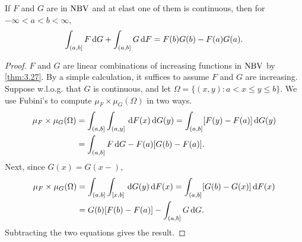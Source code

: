 \documentclass[12pt]{article} %
\begin{document}
\begin{theorem}
    If $F$ and $G$ are in $\operatorname{NBV}$ and at elast one of them is continuous, then for $-\infty < a < b < \infty$, \[\int_{(a, b]}F \, \mathrm{d} G + \int_{(a, b]}G \, \mathrm{d} F = F(b)G(b) - F(a)G(a).\]
\end{theorem}

\begin{proof}
    $F$ and $G$ are linear combinations of increasing functions in $\operatorname{NBV}$ by \cref{thm:3.27}. By a simple calculation, it suffices to assume $F$ and $G$ are increasing. Suppose w.l.o.g. that $G$ is continuous, and let $\Omega = \{(x, y) : a < x \leq y \leq b\}$. We use Fubini's to compute $\mu_F \times \mu_G(\Omega)$ in two ways. \begin{align*}
        \mu_F \times \mu_G(\Omega) &= \int_{(a, b]}\int_{(a, y]} \, \mathrm{d} F(x) \, \mathrm{d} G(y) = \int_{(a, b]} [F(y) - F(a)] \, \mathrm{d} G(y)\\
        &= \int_{(a, b]}F \, \mathrm{d} G - F(a)[G(b) - F(a)].
    \end{align*}
    Next, since $G(x) = G(x-)$, \begin{align*}
        \mu_F \times \mu_G(\Omega) &= \int_{(a, b]}\int_{[x, b]}\, \mathrm{d} G(y) \, \mathrm{d} F(x) = \int_{(a,b]} [G(b) - G(x)] \, \mathrm{d} F(x)\\
        &= G(b)[F(b) - F(a)] - \int_{(a,b]}G \, \mathrm{d} G.
    \end{align*}
    Subtracting the two equations gives the result.
\end{proof}





\pagebreak

\small



\end{document}
